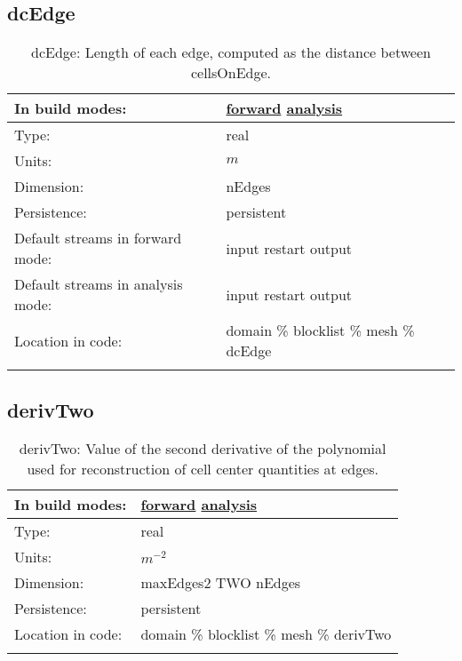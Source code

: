 \subsection[dcEdge]{dcEdge}
\label{subsec:var_sec_mesh_dcEdge}
\begin{center}
\begin{longtable}{| p{2.0in} | p{4.0in} |}
        \hline 
        In build modes: & \hyperref[subsec:forward_var_tab_mesh]{forward} \hyperref[subsec:analysis_var_tab_mesh]{analysis} \\
        \hline 
        Type: & real \\
        \hline 
        Units: & $m$ \\
        \hline 
        Dimension: & nEdges \\
        \hline 
        Persistence: & persistent \\
        \hline 
		 Default streams in forward mode: &  input restart output \\
        \hline 
		 Default streams in analysis mode: &  input restart output \\
        \hline 
		 Location in code: & domain \% blocklist \% mesh \% dcEdge \\
		 \hline 
    \caption{dcEdge: Length of each edge, computed as the distance between cellsOnEdge.}
\end{longtable}
\end{center}
\subsection[derivTwo]{derivTwo}
\label{subsec:var_sec_mesh_derivTwo}
\begin{center}
\begin{longtable}{| p{2.0in} | p{4.0in} |}
        \hline 
        In build modes: & \hyperref[subsec:forward_var_tab_mesh]{forward} \hyperref[subsec:analysis_var_tab_mesh]{analysis} \\
        \hline 
        Type: & real \\
        \hline 
        Units: & $m^{-2}$ \\
        \hline 
        Dimension: & maxEdges2 TWO nEdges \\
        \hline 
        Persistence: & persistent \\
        \hline 
		 Location in code: & domain \% blocklist \% mesh \% derivTwo \\
		 \hline 
    \caption{derivTwo: Value of the second derivative of the polynomial used for reconstruction of cell center quantities at edges.}
\end{longtable}
\end{center}

